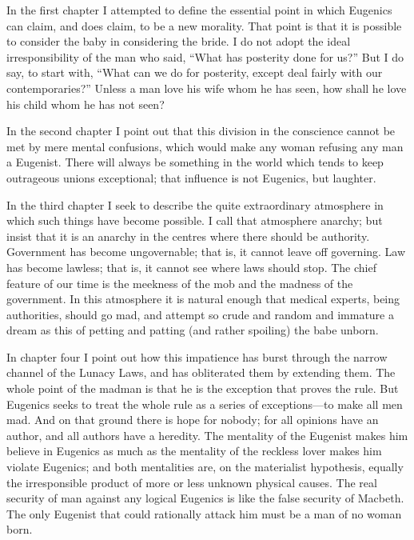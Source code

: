 \documentclass{book}
\begin{document}
In the first chapter I attempted to define the essential point in which Eugenics can claim, and does claim, to be a new morality. That point is that it is possible to consider the baby in considering the bride. I do not adopt the ideal irresponsibility of the man who said, “What has posterity done for us?” But I do say, to start with, “What can we do for posterity, except deal fairly with our contemporaries?” Unless a man love his wife whom he has seen, how shall he love his child whom he has not seen?

In the second chapter I point out that this division in the conscience cannot be met by mere mental confusions, which would make any woman refusing any man a Eugenist. There will always be something in the world which tends to keep outrageous unions exceptional; that influence is not Eugenics, but laughter.

In the third chapter I seek to describe the quite extraordinary atmosphere in which such things have become possible. I call that atmosphere anarchy; but insist that it is an anarchy in the centres where there should be authority. Government has become ungovernable; that is, it cannot leave off governing. Law has become lawless; that is, it cannot see where laws should stop. The chief feature of our time is the meekness of the mob and the madness of the government. In this atmosphere it is natural enough that medical experts, being authorities, should go mad, and attempt so crude and random and immature a dream as this of petting and patting (and rather spoiling) the babe unborn.

In chapter four I point out how this impatience has burst through the narrow channel of the Lunacy Laws, and has obliterated them by extending them. The whole point of the madman is that he is the exception that proves the rule. But Eugenics seeks to treat the whole rule as a series of exceptions—to make all men mad. And on that ground there is hope for nobody; for all opinions have an author, and all authors have a heredity. The mentality of the Eugenist makes him believe in Eugenics as much as the mentality of the reckless lover makes him violate Eugenics; and both mentalities are, on the materialist hypothesis, equally the irresponsible product of more or less unknown physical causes. The real security of man against any logical Eugenics is like the false security of Macbeth. The only Eugenist that could rationally attack him must be a man of no woman born.
\end{document}
